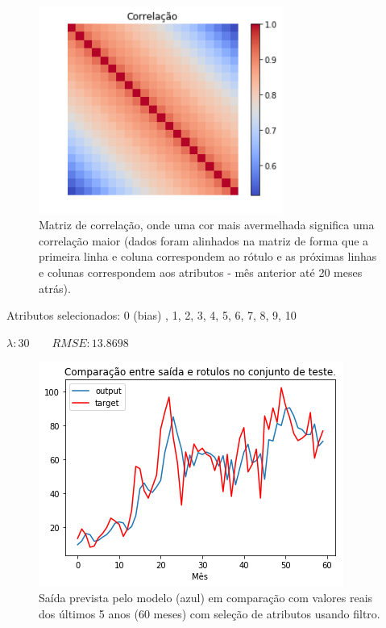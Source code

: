 \documentclass[a4paper, 12pt]{article}
\begin{document}
\begin{figure}[h!]
    \centering
    \includegraphics[width=8cm]{images/corr.png}
    \caption{Matriz de correlação, onde uma cor mais avermelhada significa uma correlação maior (dados foram alinhados na matriz de forma que a primeira linha e coluna correspondem ao rótulo e as próximas linhas e colunas correspondem aos atributos - mês anterior até 20 meses atrás).}
\end{figure}

Atributos selecionados: 0 (bias) , 1, 2, 3, 4, 5, 6, 7, 8, 9, 10

$\lambda: 30 \quad\quad RMSE: 13.8698$

\begin{figure}[h!]
    \centering
  \includegraphics[width=10cm]{images/filter.png}
    \caption{Saída prevista pelo modelo (azul) em comparação com valores reais dos últimos 5 anos (60 meses) com seleção de atributos usando filtro.}
\end{figure}
\end{document}
